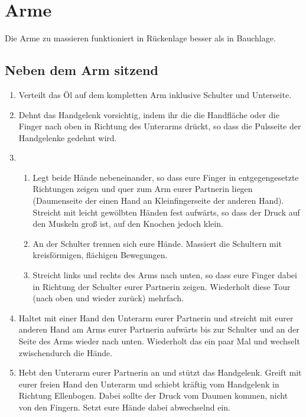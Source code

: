 \section{Arme}
Die Arme zu massieren funktioniert in Rückenlage besser als in Bauchlage.

\subsection{Neben dem Arm sitzend}

\begin{enumerate}
	\item {} Verteilt das Öl auf dem kompletten Arm inklusive Schulter und Unterseite.
	\item {} Dehnt das Handgelenk vorsichtig, indem ihr die die Handfläche oder die Finger nach oben in Richtung des Unterarms drückt, so dass die Pulsseite der Handgelenke gedehnt wird.
	\item {}
	\begin{enumerate}
		\item {} Legt beide Hände nebeneinander, so dass eure Finger in entgegengesetzte Richtungen zeigen und quer zum Arm eurer Partnerin liegen (Daumenseite der einen Hand an Kleinfingerseite der anderen Hand). Streicht mit leicht gewölbten Händen fest aufwärts, so dass der Druck auf den Muskeln groß ist, auf den Knochen jedoch klein.
		\item {} An der Schulter trennen sich eure Hände. Massiert die Schultern mit kreisförmigen, flächigen Bewegungen.
		\item {} Streicht links und rechts des Arms nach unten, so dass eure Finger dabei in Richtung der Schulter eurer Partnerin zeigen. Wiederholt diese Tour (nach oben und wieder zurück) mehrfach.
	\end{enumerate}
	\item {} Haltet mit einer Hand den Unterarm eurer Partnerin und streicht mit eurer anderen Hand am Arms eurer Partnerin aufwärts bis zur Schulter und an der Seite des Arms wieder nach unten. Wiederholt das ein paar Mal und wechselt zwischendurch die Hände.
	\item {} Hebt den Unterarm eurer Partnerin an und stützt das Handgelenk. Greift mit eurer freien Hand den Unterarm und schiebt kräftig vom Handgelenk in Richtung Ellenbogen. Dabei sollte der Druck vom Daumen kommen, nicht von den Fingern. Setzt eure Hände dabei abwechselnd ein.

\end{enumerate}
